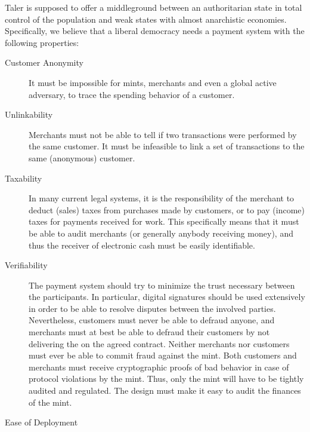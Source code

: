 \documentclass{llncs}
\begin{document}
Taler is supposed to offer a middleground between an authoritarian
state in total control of the population and weak states with almost
anarchistic economies.  Specifically, we believe that a liberal
democracy needs a payment system with the following properties:

\begin{description}
  \item[Customer Anonymity] It must be impossible for mints, merchants
    and even a global active adversary, to trace the spending behavior
    of a customer.
  \item[Unlinkability] Merchants must not be able to tell if two
    transactions were performed by the same customer.  It must be
    infeasible to link a set of transactions to the same (anonymous)
    customer. %
  \item[Taxability] In many current legal systems, it is the
    responsibility of the merchant to deduct (sales) taxes from
    purchases made by customers, or to pay (income) taxes for payments
    received for work.
    This specifically means that it must be able to audit merchants (or
    generally anybody receiving money), and thus the receiver of
    electronic cash must be easily identifiable.
  \item[Verifiability] The payment system should try to minimize the
    trust necessary between the participants.  In particular, digital
    signatures should be used extensively in order to be able to
    resolve disputes between the involved parties.  Nevertheless,
    customers must never be able to defraud anyone, and merchants must
    at best be able to defraud their customers by not delivering the
    on the agreed contract.  Neither merchants nor customers must ever
    be able to commit fraud against the mint.  Both customers and
    merchants must receive cryptographic proofs of bad behavior in
    case of protocol violations by the mint.  Thus, only the mint will
    have to be tightly audited and regulated.  The design must make it
    easy to audit the finances of the mint.
  \item[Ease of Deployment] %

\end{description}
\end{document}
